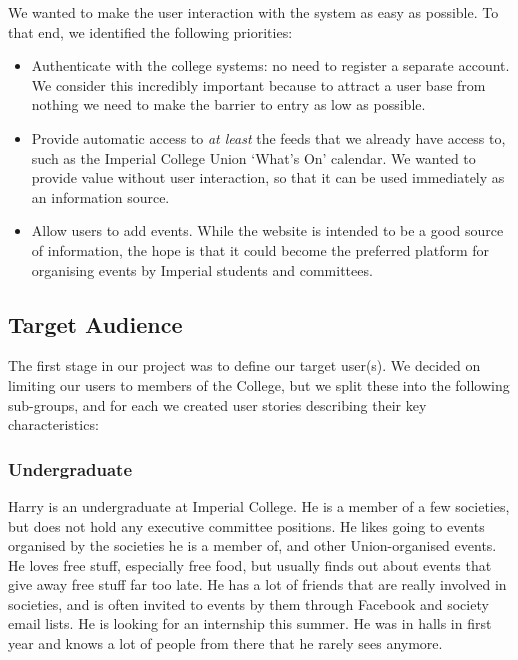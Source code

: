 \documentclass[11pt]{article}
\begin{document}
We wanted to make the user interaction with the system as easy as possible. To that end, we identified the following priorities:

\begin{itemize}
\item Authenticate with the college systems: no need to register a separate account. We consider this incredibly important because to attract a user base from nothing we need to make the barrier to entry as low as possible.

\item Provide automatic access to \textit{at least} the feeds that we already have access to, such as the Imperial College Union `What's On' calendar. We wanted to provide value without user interaction, so that it can be used immediately as an information source.

\item Allow users to add events. While the website is intended to be a good source of information, the hope is that it could become the preferred platform for organising events by Imperial students and committees.
\end{itemize}

\subsection {Target Audience}

The first stage in our project was to define our target user(s). We decided on limiting our users to members of the College, but we split these into the following sub-groups, and for each we created user stories describing their key characteristics:

\subsubsection{Undergraduate}
Harry is an undergraduate at Imperial College. He is a member of a few societies, but does not hold any executive committee positions. He likes going to events organised by the societies he is a member of, and other Union-organised events. He loves free stuff, especially free food, but usually finds out about events that give away free stuff far too late. He has a lot of friends that are really involved in societies, and is often invited to events by them through Facebook and society email lists. He is looking for an internship this summer. He was in halls in first year and knows a lot of people from there that he rarely sees anymore.
\end{document}

